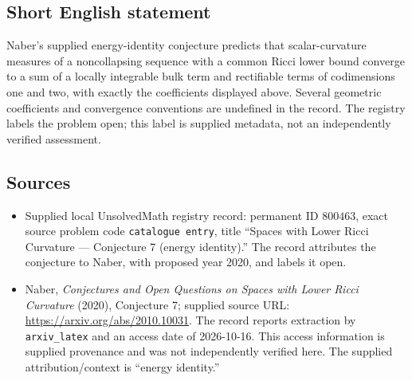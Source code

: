 \documentclass[11pt]{article}
\begin{document}
\subsection{Short English statement}
Naber's supplied energy-identity conjecture predicts that scalar-curvature measures of a noncollapsing sequence with a common Ricci lower bound converge to a sum of a locally integrable bulk term and rectifiable terms of codimensions one and two, with exactly the coefficients displayed above. Several geometric coefficients and convergence conventions are undefined in the record. The registry labels the problem open; this label is supplied metadata, not an independently verified assessment.
\subsection{Sources}
\begin{itemize}
\item Supplied local UnsolvedMath registry record: permanent ID \(800463\), exact source problem code \texttt{catalogue entry}, title ``Spaces with Lower Ricci Curvature --- Conjecture 7 (energy identity).'' The record attributes the conjecture to Naber, with proposed year 2020, and labels it open.
\item Naber, \emph{Conjectures and Open Questions on Spaces with Lower Ricci Curvature} (2020), Conjecture 7; supplied source URL: \url{https://arxiv.org/abs/2010.10031}. The record reports extraction by \texttt{arxiv\_latex} and an access date of 2026-10-16. This access information is supplied provenance and was not independently verified here. The supplied attribution/context is ``energy identity.''
\end{itemize}
\end{document}
